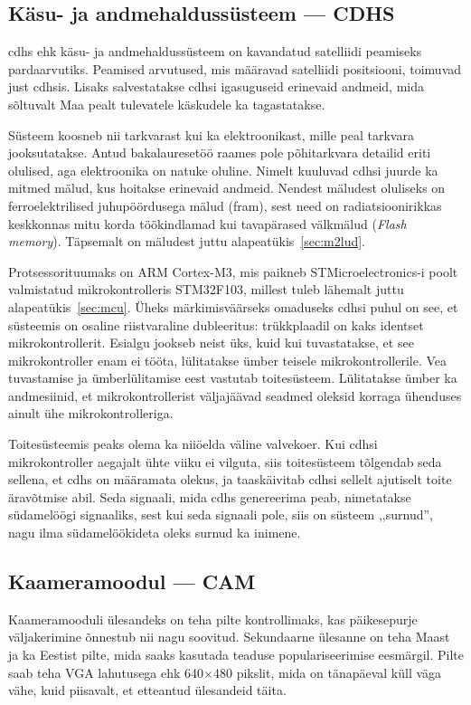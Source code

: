 \documentclass[12pt,a4paper]{article}
\begin{document}
\subsection{Käsu- ja andmehaldussüsteem --- CDHS}
\gls{cdhs} ehk käsu- ja andmehaldussüsteem on kavandatud satelliidi peamiseks
pardaarvutiks. Peamised arvutused, mis määravad satelliidi positsiooni, toimuvad
just \gls{cdhs}is. Lisaks salvestatakse \gls{cdhs}i igasuguseid erinevaid
andmeid, mida sõltuvalt Maa pealt tulevatele käskudele ka tagastatakse.

Süsteem koosneb nii tarkvarast kui ka elektroonikast, mille peal tarkvara
jooksutatakse. Antud bakalauresetöö raames pole põhitarkvara detailid eriti
olulised, aga elektroonika on natuke oluline. Nimelt kuuluvad \gls{cdhs}i juurde
ka mitmed mälud, kus hoitakse erinevaid andmeid. Nendest mäludest oluliseks on
ferroelektrilised juhupöördusega mälud (\gls{fram}), sest need on
radiatsioonirikkas keskkonnas mitu korda töökindlamad kui tavapärased välkmälud
(\textit{Flash memory}). Täpsemalt on mäludest juttu
alapeatükis~\ref{sec:m2lud}.

Protsessorituumaks on ARM Cortex-M3, mis paikneb STMicroelectronics-i poolt
valmistatud mikrokontrolleris STM32F103, millest tuleb lähemalt juttu
alapeatükis~\ref{sec:mcu}. Üheks märkimisväärseks omaduseks \gls{cdhs}i puhul on
see, et süsteemis on osaline riistvaraline dubleeritus: trükkplaadil on kaks
identset mikrokontrollerit. Esialgu jookseb neist üks, kuid kui tuvastatakse, et
see mikrokontroller enam ei tööta, lülitatakse ümber teisele mikrokontrollerile.
Vea tuvastamise ja ümberlülitamise eest vastutab toitesüsteem. Lülitatakse ümber
ka andmesiinid, et mikrokontrollerist väljajäävad seadmed oleksid korraga
ühenduses ainult ühe mikrokontrolleriga.

Toitesüsteemis peaks olema ka niiöelda väline valvekoer. Kui \gls{cdhs}i
mikrokontroller aegajalt ühte viiku ei vilguta, siis toitesüsteem tõlgendab seda
sellena, et \gls{cdhs} on määramata olekus, ja taaskäivitab \gls{cdhs}i sellelt
ajutiselt toite äravõtmise abil. Seda signaali, mida \gls{cdhs} genereerima
peab, nimetatakse südamelöögi signaaliks, sest kui seda signaali pole, siis on
süsteem ,,surnud'', nagu ilma südamelöökideta oleks surnud ka inimene.

\subsection{Kaameramoodul --- CAM}
Kaameramooduli ülesandeks on teha pilte kontrollimaks, kas päikesepurje
väljakerimine õnnestub nii nagu soovitud. Sekundaarne ülesanne on teha Maast ja
ka Eestist pilte, mida saaks kasutada teaduse populariseerimise eesmärgil.
Pilte saab teha VGA lahutusega ehk 640\(\times\)480 pikslit, mida on
tänapäeval küll väga vähe, kuid piisavalt, et etteantud ülesandeid täita.
\end{document}
